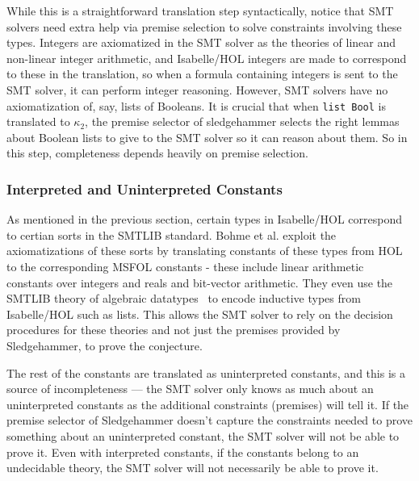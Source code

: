 \documentclass{article}
\begin{document}
	While this is a straightforward
	translation step syntactically, 
	notice that SMT solvers need 
	extra help via premise selection 
	to solve constraints involving 
	these types. Integers are 
	axiomatized in the SMT solver as 
	the theories of linear and 
	non-linear integer arithmetic, and 
	Isabelle/HOL integers are made to 
	correspond to these in the translation, 
	so when a formula containing 
	integers is sent to the SMT solver, 
	it can perform integer reasoning. 
	However, SMT solvers have no 
	axiomatization of, say, lists 
	of Booleans. It is crucial that when 
	\texttt{list Bool} is 
	translated to $\kappa_2$, the 
	premise selector of sledgehammer
	selects the right lemmas about 
	Boolean lists to give to the 
	SMT solver so it can reason 
	about them. So in this step, 
	completeness depends heavily on 
	premise selection.
	
	\subsubsection{Interpreted and Uninterpreted Constants}
	As mentioned in the previous section,
	certain types in Isabelle/HOL correspond
	to certian sorts in the SMTLIB standard.
	Bohme et al. exploit the axiomatizations 
	of these sorts by translating constants 
	of these types from HOL to the 
	corresponding MSFOL constants - these 
	include linear arithmetic constants over 
	integers and reals and bit-vector 
	arithmetic. They even use the SMTLIB 
	theory of algebraic 
	datatypes~\cite{BarST-PDPAR-06} to 
	encode inductive types from Isabelle/HOL
	such as lists. This allows the SMT solver
	to rely on the decision procedures for 
	these theories and not just the premises
	provided by Sledgehammer, to prove the 
	conjecture. 
	
	The rest of the constants are 
	translated as uninterpreted constants, 
	and this is a source of 
	incompleteness --- the SMT solver only 
	knows as much about an uninterpreted 
	constants as the additional constraints 
	(premises) will tell it. If the premise 
	selector of Sledgehammer doesn't capture 
	the constraints needed to prove something
	about an uninterpreted constant, the SMT 
	solver will not be able to prove it.
	Even with interpreted constants, if the 
	constants belong to an undecidable theory,
	the SMT solver will not necessarily be 
	able to prove it.
	
	
	
	
\end{document}
